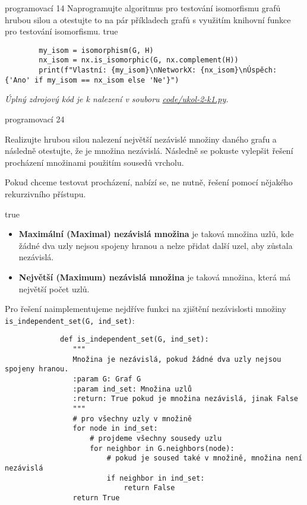 \documentclass[10pt, a4paper]{ReportSheet}
\begin{document}
\begin{uloha}{programovací 1}{4}{
        Naprogramujte algoritmus pro testování isomorfismu grafů hrubou silou a otestujte to na pár příkladech grafů s využitím knihovní funkce pro testování isomorfismu.
    }{true}
\begin{verbatim}
        my_isom = isomorphism(G, H)
        nx_isom = nx.is_isomorphic(G, nx.complement(H))
        print(f"Vlastní: {my_isom}\nNetworkX: {nx_isom}\nÚspěch: {'Ano' if my_isom == nx_isom else 'Ne'}")
        \end{verbatim}

        \textit{
            Úplný zdrojový kód je k nalezení v souboru \href{https://github.com/filipditrich/MMAD-2024/blob/main/code/ukol-2-k1.py}{code/ukol-2-k1.py}.
        }
    \end{uloha}

    \begin{uloha}{programovací 2}{4}{
        Realizujte hrubou silou nalezení největší nezávislé množiny daného grafu a následně otestujte, že je množina nezávislá. Následně se pokuste vylepšit řešení procházení množinami použitím sousedů vrcholu.

        Pokud chceme testovat procházení, nabízí se, ne nutně, řešení pomocí nějakého rekurzivního přístupu.
    }{true}
        \begin{itemize}
            \item \textbf{Maximální (Maximal) nezávislá množina} je taková množina uzlů, kde žádné dva uzly nejsou spojeny
            hranou a nelze přidat další uzel, aby zůstala nezávislá.
            \item \textbf{Největší (Maximum) nezávislá množina} je taková množina, která má největší počet uzlů.
        \end{itemize}

        Pro řešení naimplementujeme nejdříve funkci na zjištění nezávislosti množiny \texttt{is\_independent\_set(G,~ind\_set)}:
        \begin{verbatim}
             def is_independent_set(G, ind_set):
                """
                Množina je nezávislá, pokud žádné dva uzly nejsou spojeny hranou.
                :param G: Graf G
                :param ind_set: Množina uzlů
                :return: True pokud je množina nezávislá, jinak False
                """
                # pro všechny uzly v množině
                for node in ind_set:
                    # projdeme všechny sousedy uzlu
                    for neighbor in G.neighbors(node):
                        # pokud je soused také v množině, množina není nezávislá
                        if neighbor in ind_set:
                            return False
                return True
        \end{verbatim}


\end{uloha}
\end{document}
